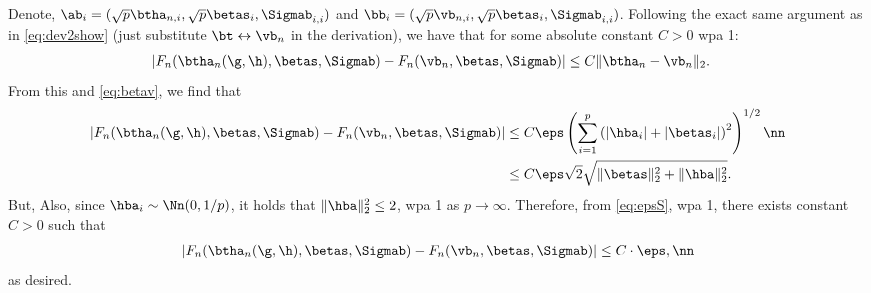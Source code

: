 Denote, $\ab_i=(\sqrt{p}\btha_{n,i},\sqrt{p}\betas_i,\Sigmab_{i,i})$ and $\bb_i=(\sqrt{p}\vb_{n,i},\sqrt{p}\betas_i,\Sigmab_{i,i})$. Following the exact same argument as in \eqref{eq:dev2show} (just substitute $\bt\leftrightarrow\vb_n$ in the derivation), we have that for some absolute constant $C>0$ wpa 1:
\begin{align}
|F_n(\btha_n(\g,\h),\betas,\Sigmab) - F_n(\vb_n,\betas,\Sigmab)| &\leq C \|\btha_n-\vb_n\|_2.
\end{align}
From this and \eqref{eq:betav}, we find that
\begin{align}
|F_n(\btha_n(\g,\h),\betas,\Sigmab) - F_n(\vb_n,\betas,\Sigmab)|
&\leq  
C\eps \left(\sum_{i=1}^p \left(|\hba_i|+|\betas_i|\right)^2\right)^{1/2}\nn
\\
 &\leq 
C\eps\sqrt{2}\sqrt{\|\betas\|_2^2 + \|\hba\|_2^2}.\label{eq:epsS}
\end{align}
But, 
Also, since $\hba_i\sim\Nn(0,1/p)$, it holds that $\|\hba\|_2^2\leq 2$, wpa 1 as $p\rightarrow\infty$. Therefore, from \eqref{eq:epsS}, wpa 1, there exists constant $C>0$ such that 
\begin{align}
|F_n(\btha_n(\g,\h),\betas,\Sigmab) - F_n(\vb_n,\betas,\Sigmab)| \leq C \cdot\eps,\nn
\end{align}
as desired.


